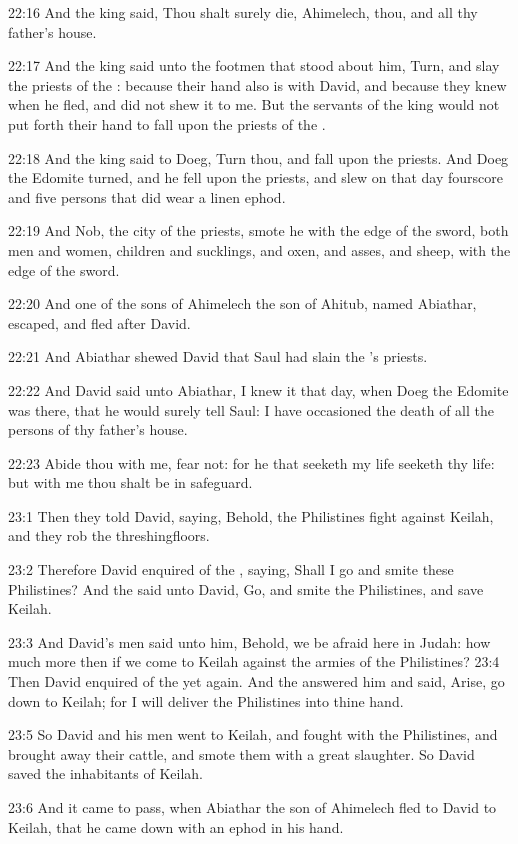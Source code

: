 22:16 And the king said, Thou shalt surely die, Ahimelech, thou, and all thy father's house.

22:17 And the king said unto the footmen that stood about him, Turn, and slay the priests of the \LORD: because their hand also is with David, and because they knew when he fled, and did not shew it to me.  But the servants of the king would not put forth their hand to fall upon the priests of the \LORD.

22:18 And the king said to Doeg, Turn thou, and fall upon the priests.  And Doeg the Edomite turned, and he fell upon the priests, and slew on that day fourscore and five persons that did wear a linen ephod.

22:19 And Nob, the city of the priests, smote he with the edge of the sword, both men and women, children and sucklings, and oxen, and asses, and sheep, with the edge of the sword.

22:20 And one of the sons of Ahimelech the son of Ahitub, named Abiathar, escaped, and fled after David.

22:21 And Abiathar shewed David that Saul had slain the \LORD's priests.

22:22 And David said unto Abiathar, I knew it that day, when Doeg the Edomite was there, that he would surely tell Saul: I have occasioned the death of all the persons of thy father's house.

22:23 Abide thou with me, fear not: for he that seeketh my life seeketh thy life: but with me thou shalt be in safeguard.

23:1 Then they told David, saying, Behold, the Philistines fight against Keilah, and they rob the threshingfloors.

23:2 Therefore David enquired of the \LORD, saying, Shall I go and smite these Philistines? And the \LORD said unto David, Go, and smite the Philistines, and save Keilah.

23:3 And David's men said unto him, Behold, we be afraid here in Judah: how much more then if we come to Keilah against the armies of the Philistines?  23:4 Then David enquired of the \LORD yet again. And the \LORD answered him and said, Arise, go down to Keilah; for I will deliver the Philistines into thine hand.

23:5 So David and his men went to Keilah, and fought with the Philistines, and brought away their cattle, and smote them with a great slaughter. So David saved the inhabitants of Keilah.

23:6 And it came to pass, when Abiathar the son of Ahimelech fled to David to Keilah, that he came down with an ephod in his hand.

